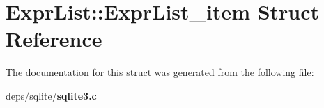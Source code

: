 \section{Expr\-List::Expr\-List\_\-item Struct Reference}
\label{structExprList_1_1ExprList__item}


The documentation for this struct was generated from the following file:\begin{CompactItemize}
\item 
deps/sqlite/\bf{sqlite3.c}\end{CompactItemize}
